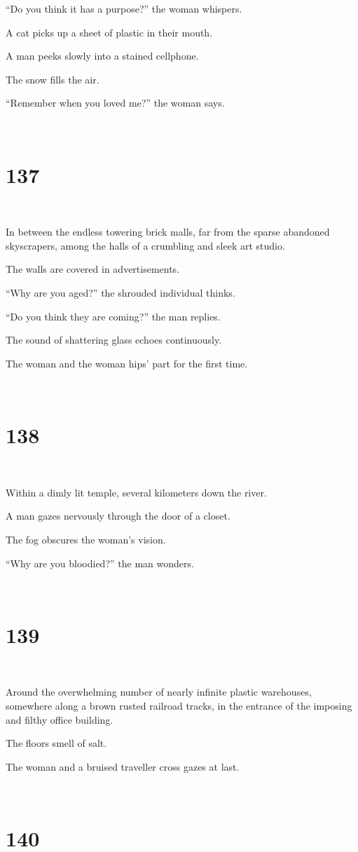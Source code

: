 \documentclass{report}
\begin{document}
``Do you think it has a purpose?'' the woman whispers.

A cat picks up a sheet of plastic in their mouth.

A man peeks slowly into a stained cellphone.

The snow fills the air.

``Remember when you loved me?'' the woman says.

~
\chapter*{137}
~

In between the endless towering brick malls, far from the sparse abandoned skyscrapers, among the halls of a crumbling and sleek art studio.

The walls are covered in advertisements.

``Why are you aged?'' the shrouded individual thinks.

``Do you think they are coming?'' the man replies.

The sound of shattering glass echoes continuously.

The woman and the woman hips' part for the first time.

~
\chapter*{138}
~

Within a dimly lit temple, several kilometers down the river.

A man gazes nervously through the door of a closet.

The fog obscures the woman's vision.

``Why are you bloodied?'' the man wonders.

~
\chapter*{139}
~

Around the overwhelming number of nearly infinite plastic warehouses, somewhere along a brown rusted railroad tracks, in the entrance of the imposing and filthy office building.

The floors smell of salt.

The woman and a bruised traveller cross gazes at last.

~
\chapter*{140}
~
\end{document}
